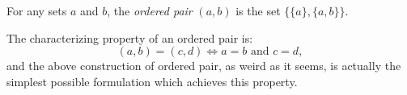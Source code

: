 \documentclass{article}
\begin{document}
For any sets $a$ and $b$, the {\em ordered pair} $(a,b)$ is the set $\{\{a\}, \{a,b\}\}$.

The characterizing property of an ordered pair is:
$$
(a,b) = (c,d) \iff a=b \text{\ \ and\ \ } c=d,
$$
and the above construction of ordered pair, as weird as it seems, is actually the simplest possible formulation which achieves this property.
\end{document}
